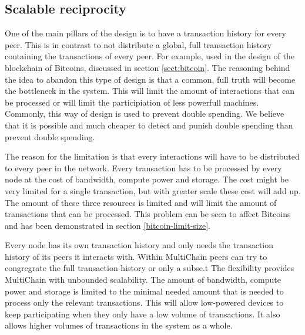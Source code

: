 \subsection{Scalable reciprocity}
\label{sect:scalable-reciprocity}
One of the main pillars of the design is to have a transaction history for every peer.
This is in contrast to not distribute a global, full transaction history containing the transactions of every peer.
For example, used in the design of the blockchain of Bitcoins, discussed in section \ref{sect:bitcoin}.
The reasoning behind the idea to abandon this type of design is that a common, full truth
will become the bottleneck in the system.
This will limit the amount of interactions that can be processed
or will limit the participiation of less powerfull machines.
Commonly, this way of design is used to prevent double spending.
We believe that it is possible and much cheaper to detect and punish double spending than prevent double spending.

The reason for the limitation is that every interactions will have to be distributed to every peer in the network.
Every transaction has to be processed by every node at the cost of bandwidth, compute power and storage.
The cost might be very limited for a single transaction,
but with greater scale these cost will add up.
The amount of these three resources is limited and will limit the amount of transactions that can be processed.
This problem can be seen to affect Bitcoins and has been demonstrated in section \ref{bitcoin-limit-size}.

Every node has its own transaction history and only needs the transaction history of its peers it interacts with.
Within MultiChain peers can try to congregrate the full transaction history or only a subse.t
The flexibility provides MultiChain with unbounded scalability.
The amount of bandwidth, compute power and storage is limited to the minimal needed amount
that is needed to process only the relevant transactions.
This will allow low-powered devices to keep participating when they only have a low volume of transactions.
It also allows higher volumes of transactions in the system as a whole.